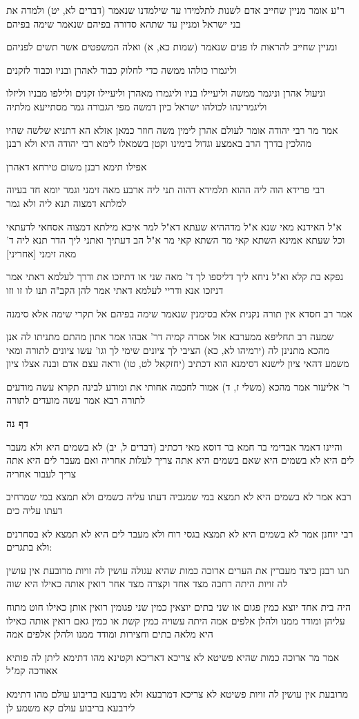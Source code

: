 \documentclass[12pt, openany]{book}
\newcommand{\sethebfont}{
\fontsize{10.5pt}{21.0pt} \selectfont
}
\newcommand{\textblock}[1]{
{\sethebfont #1\\}	
}
\newcommand{\sectname}{}
\newcommand{\newsection}[1]{
	\addcontentsline{toc}{section}{#1}
	\renewcommand{\sectname}{#1}	
	\vspace{-\baselineskip}
	\begin{center}
		\textbf{%
\fontsize{16pt}{16pt}\selectfont
			#1}
	\end{center}
	\vspace{-\baselineskip}
	\nopagebreak
}
\begin{document}
\textblock{ר"ע אומר מניין שחייב אדם לשנות לתלמידו עד שילמדנו שנאמר (דברים לא, יט) ולמדה את בני ישראל ומניין עד שתהא סדורה בפיהם שנאמר שימה בפיהם}
\textblock{ומניין שחייב להראות לו פנים שנאמר (שמות כא, א) ואלה המשפטים אשר תשים לפניהם}
\textblock{וליגמרו כולהו ממשה כדי לחלוק כבוד לאהרן ובניו וכבוד לזקנים}
\textblock{וניעול אהרן וניגמר ממשה וליעיילו בניו וליגמרו מאהרן וליעיילו זקנים ולילפו מבניו וליזלו וליגמרינהו לכולהו ישראל כיון דמשה מפי הגבורה גמר מסתייעא מלתיה}
\textblock{אמר מר רבי יהודה אומר לעולם אהרן לימין משה חוזר כמאן אזלא הא דתניא שלשה שהיו מהלכין בדרך הרב באמצע וגדול בימינו וקטן בשמאלו לימא רבי יהודה היא ולא רבנן}
\textblock{אפילו תימא רבנן משום טירחא דאהרן}
\textblock{רבי פרידא הוה ליה ההוא תלמידא דהוה תני ליה ארבע מאה זימני וגמר יומא חד בעיוה למלתא דמצוה תנא ליה ולא גמר}
\textblock{א"ל האידנא מאי שנא א"ל מדההיא שעתא דא"ל למר איכא מילתא דמצוה אסחאי לדעתאי וכל שעתא אמינא השתא קאי מר השתא קאי מר א"ל הב דעתיך ואתני ליך הדר תנא ליה ד' מאה זימני [אחריני]}
\textblock{נפקא בת קלא וא"ל ניחא ליך דליספו לך ד' מאה שני או דתיזכו את ודרך לעלמא דאתי אמר דניזכו אנא ודריי לעלמא דאתי אמר להן הקב"ה תנו לו זו וזו}
\textblock{אמר רב חסדא אין תורה נקנית אלא בסימנין שנאמר שימה בפיהם אל תקרי שימה אלא סימנה}
\textblock{שמעה רב תחליפא ממערבא אזל אמרה קמיה דר' אבהו אמר אתון מהתם מתניתו לה אנן מהכא מתנינן לה (ירמיהו לא, כא) הציבי לך ציונים שימי לך וגו' עשו ציונים לתורה ומאי משמע דהאי ציון לישנא דסימנא הוא דכתיב (יחזקאל לט, טו) וראה עצם אדם ובנה אצלו ציון}
\textblock{ר' אליעזר אמר מהכא (משלי ז, ד) אמור לחכמה אחותי את ומודע לבינה תקרא עשה מודעים לתורה רבא אמר עשה מועדים לתורה}
\newsection{דף נה}
\textblock{והיינו דאמר אבדימי בר חמא בר דוסא מאי דכתיב (דברים ל, יב) לא בשמים היא ולא מעבר לים היא לא בשמים היא שאם בשמים היא אתה צריך לעלות אחריה ואם מעבר לים היא אתה צריך לעבור אחריה}
\textblock{רבא אמר לא בשמים היא לא תמצא במי שמגביה דעתו עליה כשמים ולא תמצא במי שמרחיב דעתו עליה כים}
\textblock{רבי יוחנן אמר לא בשמים היא לא תמצא בגסי רוח ולא מעבר לים היא לא תמצא לא בסחרנים ולא בתגרים:}
\textblock{תנו רבנן כיצד מעברין את הערים ארוכה כמות שהיא עגולה עושין לה זויות מרובעת אין עושין לה זויות היתה רחבה מצד אחד וקצרה מצד אחר רואין אותה כאילו היא שוה}
\textblock{היה בית אחד יוצא כמין פגום או שני בתים יוצאין כמין שני פגומין רואין אותן כאילו חוט מתוח עליהן ומודד ממנו ולהלן אלפים אמה היתה עשויה כמין קשת או כמין גאם רואין אותה כאילו היא מלאה בתים וחצירות ומודד ממנו ולהלן אלפים אמה}
\textblock{אמר מר ארוכה כמות שהיא פשיטא לא צריכא דאריכא וקטינא מהו דתימא ליתן לה פותיא אאורכה קמ"ל}
\textblock{מרובעת אין עושין לה זויות פשיטא לא צריכא דמרבעא ולא מרבעא בריבוע עולם מהו דתימא לירבעא בריבוע עולם קא משמע לן}
\end{document}
